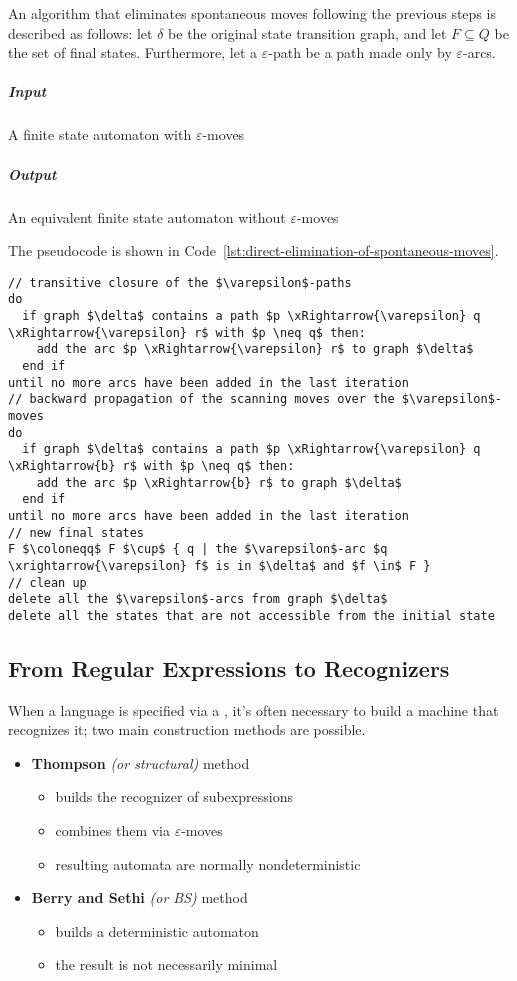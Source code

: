 \documentclass[english]{article}
\begin{document}
\bigskip
An algorithm that eliminates spontaneous moves following the previous steps is described as follows:
let \(\delta\) be the original state transition graph, and let \(F \subseteq Q\) be the set of final states.
Furthermore, let a \(\varepsilon\)-path be a path made only by \(\varepsilon\)-arcs.

\subparagraph*{Input}
A finite state automaton with \(\varepsilon\)-moves

\subparagraph*{Output}
An equivalent finite state automaton without \(\varepsilon\)-moves

\bigskip
The pseudocode is shown in Code~\ref{lst:direct-elimination-of-spontaneous-moves}.

\begin{lstlisting}[caption={Direct elimination of spontaneous moves}, label={lst:direct-elimination-of-spontaneous-moves}]
// transitive closure of the $\varepsilon$-paths
do
  if graph $\delta$ contains a path $p \xRightarrow{\varepsilon} q \xRightarrow{\varepsilon} r$ with $p \neq q$ then:
    add the arc $p \xRightarrow{\varepsilon} r$ to graph $\delta$
  end if
until no more arcs have been added in the last iteration
// backward propagation of the scanning moves over the $\varepsilon$-moves
do
  if graph $\delta$ contains a path $p \xRightarrow{\varepsilon} q \xRightarrow{b} r$ with $p \neq q$ then:
    add the arc $p \xRightarrow{b} r$ to graph $\delta$
  end if
until no more arcs have been added in the last iteration
// new final states
F $\coloneqq$ F $\cup$ { q | the $\varepsilon$-arc $q \xrightarrow{\varepsilon} f$ is in $\delta$ and $f \in$ F }
// clean up
delete all the $\varepsilon$-arcs from graph $\delta$
delete all the states that are not accessible from the initial state
\end{lstlisting}

\subsection{From Regular Expressions to Recognizers}

When a language is specified via a \re, it's often necessary to build a machine that recognizes it;
two main construction methods are possible.

\begin{itemize}
  \item \textbf{Thompson} \textit{(or structural)} method
        \begin{itemize}
          \item builds the recognizer of subexpressions
          \item combines them via \(\varepsilon\)-moves
          \item resulting automata are normally nondeterministic
        \end{itemize}
  \item \textbf{Berry and Sethi} \textit{(or BS)} method
        \begin{itemize}
          \item builds a deterministic automaton
          \item the result is not necessarily minimal
        \end{itemize}
\end{itemize}
\end{document}
